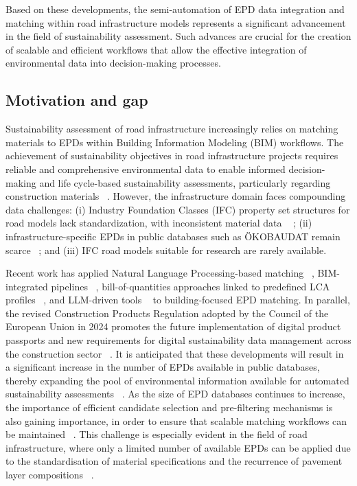 \documentclass[10pt, a4paper, twocolumn]{article}
\begin{document}
Based on these developments, the semi-automation of EPD data integration and matching within road infrastructure models represents a significant advancement in the field of sustainability assessment. Such advances are crucial for the creation of scalable and efficient workflows that allow the effective integration of environmental data into decision-making processes.


\subsection{Motivation and gap}

Sustainability assessment of road infrastructure increasingly relies on matching materials to EPDs within Building Information Modeling (BIM) workflows. The achievement of sustainability objectives in road infrastructure projects requires reliable and comprehensive environmental data to enable informed decision-making and life cycle-based sustainability assessments, particularly regarding construction materials ~\cite{Kaus.2025}. However, the infrastructure domain faces compounding data challenges: (i) Industry Foundation Classes (IFC) property set structures for road models lack standardization, with inconsistent material data ~\cite{Wastiels.2019,PotrcObrecht.2020} ; (ii) infrastructure-specific EPDs in public databases such as ÖKOBAUDAT remain scarce ~\cite{Kaus.2025}; and (iii) IFC road models suitable for research are rarely available.

Recent work has applied Natural Language Processing-based matching ~\cite{Forth.2023}, BIM-integrated pipelines ~\cite{Hermann.2024}, bill-of-quantities approaches linked to predefined LCA profiles ~\cite{J.HofmeyerK.ForthS.EsserA.Borrmann.}, and LLM-driven tools ~\cite{Petrosa.2025} to building-focused EPD matching. In parallel, the revised Construction Products Regulation adopted by the Council of the European Union in 2024 promotes the future implementation of digital product passports and new requirements for digital sustainability data management across the construction sector ~\cite{CounciloftheEU.2024}. It is anticipated that these developments will result in a significant increase in the number of EPDs available in public databases, thereby expanding the pool of environmental information available for automated sustainability assessments ~\cite{Construction Products Regulation (EU) 2024/3110}. As the size of EPD databases continues to increase, the importance of efficient candidate selection and pre-filtering mechanisms is also gaining importance, in order to ensure that scalable matching workflows can be maintained ~\cite{Petrosa.2025}. This challenge is especially evident in the field of road infrastructure, where only a limited number of available EPDs can be applied due to the standardisation of material specifications and the recurrence of pavement layer compositions ~\cite{ Kaus.2025; Petrosa.2025}. 
\end{document}
